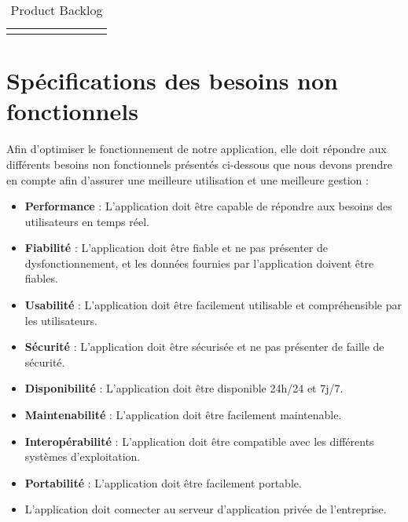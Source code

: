 \begin{landscape}
\begin{adjustwidth}{-1cm}{}
\begin{longtable}{|c|p{3cm}|p{8cm}|c|c|p{2cm}|p{2cm}|c|}


    \hline
        \caption{Product Backlog}
        \label{tab:product_backlog}
      
      \end{longtable}
    \end{adjustwidth}
\end{landscape}

\section{Spécifications des besoins non fonctionnels}
Afin d'optimiser le fonctionnement de notre application, elle doit répondre aux différents besoins non fonctionnels présentés ci-dessous que nous devons prendre en compte afin d'assurer une meilleure utilisation et une meilleure gestion :

\begin{itemize}
\item \textbf{Performance} : L'application doit être capable de répondre aux besoins des utilisateurs en temps réel.
\item \textbf{Fiabilité} : L'application doit être fiable et ne pas présenter de dysfonctionnement, et les données fournies par l'application doivent être fiables.
\item \textbf{Usabilité} : L'application doit être facilement utilisable et compréhensible par les utilisateurs.
\item \textbf{Sécurité} : L'application doit être sécurisée et ne pas présenter de faille de sécurité.
\item \textbf{Disponibilité} : L'application doit être disponible 24h/24 et 7j/7.
\item \textbf{Maintenabilité} : L'application doit être facilement maintenable.
\item \textbf{Interopérabilité} : L'application doit être compatible avec les différents systèmes d'exploitation.
\item \textbf{Portabilité} : L'application doit être facilement portable.
\item L'application doit connecter au serveur d'application privée de l'entreprise.
\end{itemize}

